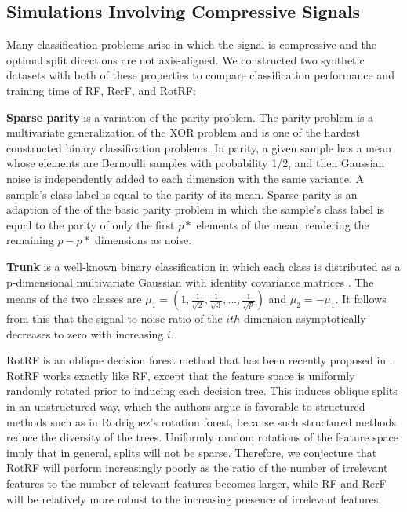 \documentclass{article}
\begin{document}

\subsection{Simulations Involving Compressive Signals}
\label{section: sims}

Many classification problems arise in which the signal is compressive and the optimal split directions are not axis-aligned. We constructed two synthetic datasets with both of these properties to compare classification performance and training time of RF, RerF, and RotRF:

\textbf{Sparse parity} is a variation of the parity problem. The parity problem is a multivariate generalization of the XOR problem and is one of the hardest constructed binary classification problems. In parity, a given sample has a mean whose elements are Bernoulli samples with probability 1/2, and then Gaussian noise is independently added to each dimension with the same variance.  A sample's class label is equal to the parity of its mean. Sparse parity is an adaption of the of the basic parity problem in which the sample's class label is equal to the parity of only the first $p*$ elements of the mean, rendering the remaining $p - p*$ dimensions as noise.

\textbf{Trunk} is a well-known binary classification in which each class is distributed as a p-dimensional multivariate Gaussian with identity covariance matrices \cite{Trunk1979}. The means of the two classes are $\mu_1 = (1,\frac{1}{\sqrt{2}},\frac{1}{\sqrt{3}},...,\frac{1}{\sqrt{p}})$ and $\mu_2 = -\mu_1$. It follows from this that the signal-to-noise ratio of the $ith$ dimension asymptotically decreases to zero with increasing $i$.

RotRF is an oblique decision forest method that has been recently proposed in \cite{Blaser2015}. RotRF works exactly like RF, except that the feature space is uniformly randomly rotated prior to inducing each decision tree. This induces oblique splits in an unstructured way, which the authors argue is favorable to structured methods such as in Rodriguez's rotation forest, because such structured methods reduce the diversity of the trees. Uniformly random rotations of the feature space imply that in general, splits will not be sparse. Therefore, we conjecture that RotRF will perform increasingly poorly as the ratio of the number of irrelevant features to the number of relevant features becomes larger, while RF and RerF will be relatively more robust to the increasing presence of irrelevant features.
\end{document}
